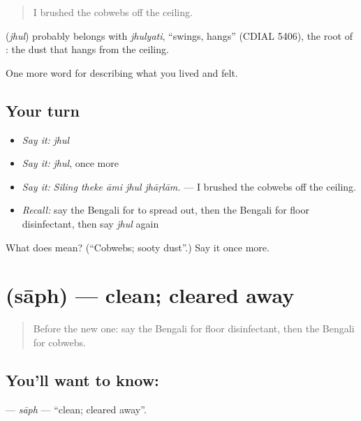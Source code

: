 \begin{quote}
I brushed the cobwebs off the ceiling.
\end{quote}

\begin{cousinweb}
\textbf{} (\emph{jhul}) probably belongs with \emph{jhulyati}, \textquotedblleft{}swings, hangs\textquotedblright{} (CDIAL 5406), the root of : the dust that hangs from the ceiling.
\end{cousinweb}

\begin{grammarlens}[title={What you've built}]
One more word for describing what you lived and felt.
\end{grammarlens}

\subsection*{Your turn}
\begin{itemize}
\raggedright
  \item \emph{Say it:} \emph{jhul}
  \item \emph{Say it:} \emph{jhul}, once more
  \item \emph{Say it:} \emph{Siling theke āmi jhul jhāṛlām.} — I brushed the cobwebs off the ceiling.
  \item \emph{Recall:} say the Bengali for to spread out, then the Bengali for floor disinfectant, then say \emph{jhul} again
\end{itemize}

\begin{tcolorbox}[breakable,colback=teal!4,colframe=teal!35!black,title={Before you move on}]
What does  mean? (\textquotedblleft{}Cobwebs; sooty dust\textquotedblright{}.) Say it once more.
\end{tcolorbox}
\section[\texorpdfstring{\bn{সাফ} (sāph)}{সাফ (sāph)}]{ (sāph) — clean; cleared away}

\label{lesson:BN-C510-saph}



\begin{quote}
Before the new one: say the Bengali for floor disinfectant, then the Bengali for cobwebs.
\end{quote}

\subsection*{You'll want to know: }
\textbf{} — \emph{sāph} — \textquotedblleft{}clean; cleared away\textquotedblright{}.

